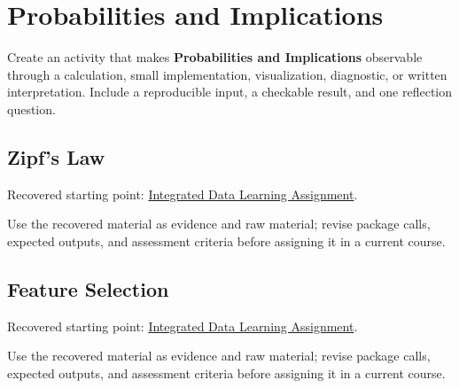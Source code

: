 \documentclass[
  letterpaper,
]{scrbook}
\begin{document}
\section*{Probabilities and
Implications}\label{sec-pr-11-probabilities-and-implications}


\begin{tcolorbox}[enhanced jigsaw, arc=.35mm, bottomrule=.15mm, bottomtitle=1mm, breakable, colback=white, colbacktitle=quarto-callout-note-color!10!white, colframe=quarto-callout-note-color-frame, coltitle=black, left=2mm, leftrule=.75mm, opacityback=0, opacitybacktitle=0.6, rightrule=.15mm, title=\textcolor{quarto-callout-note-color}{\faInfo}\hspace{0.5em}{Practice development scaffold}, titlerule=0mm, toprule=.15mm, toptitle=1mm]

Create an activity that makes \textbf{Probabilities and Implications}
observable through a calculation, small implementation, visualization,
diagnostic, or written interpretation. Include a reproducible input, a
checkable result, and one reflection question.

\end{tcolorbox}

\subsection*{Zipf's Law}\label{sec-pr-11-zipf-s-law}

Recovered starting point:
\hyperref[sec-lab-integrated-learning-assignment]{Integrated Data
Learning Assignment}.

Use the recovered material as evidence and raw material; revise package
calls, expected outputs, and assessment criteria before assigning it in
a current course.

\subsection*{Feature Selection}\label{sec-pr-11-feature-selection}

Recovered starting point:
\hyperref[sec-lab-integrated-learning-assignment]{Integrated Data
Learning Assignment}.

Use the recovered material as evidence and raw material; revise package
calls, expected outputs, and assessment criteria before assigning it in
a current course.
\end{document}
